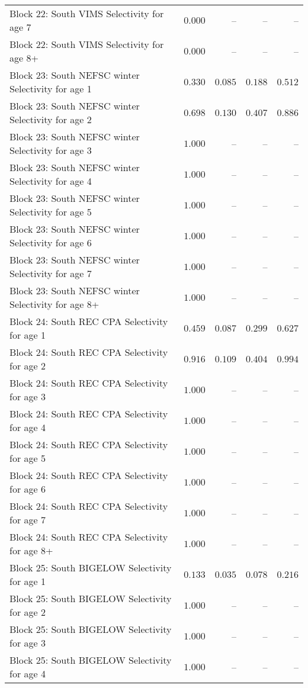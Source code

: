 \documentclass[
]{article}
\begin{document}
\begin{landscape}
\begin{longtable}[t]{lrrrr}
Block 22: South VIMS Selectivity for age 7 & $0.000$ & -- & -- & --\\
Block 22: South VIMS Selectivity for age 8+ & $0.000$ & -- & -- & --\\
Block 23: South NEFSC winter Selectivity for age 1 & $0.330$ & $0.085$ & $0.188$ & $0.512$\\
\addlinespace
Block 23: South NEFSC winter Selectivity for age 2 & $0.698$ & $0.130$ & $0.407$ & $0.886$\\
Block 23: South NEFSC winter Selectivity for age 3 & $1.000$ & -- & -- & --\\
Block 23: South NEFSC winter Selectivity for age 4 & $1.000$ & -- & -- & --\\
Block 23: South NEFSC winter Selectivity for age 5 & $1.000$ & -- & -- & --\\
Block 23: South NEFSC winter Selectivity for age 6 & $1.000$ & -- & -- & --\\
\addlinespace
Block 23: South NEFSC winter Selectivity for age 7 & $1.000$ & -- & -- & --\\
Block 23: South NEFSC winter Selectivity for age 8+ & $1.000$ & -- & -- & --\\
Block 24: South REC CPA Selectivity for age 1 & $0.459$ & $0.087$ & $0.299$ & $0.627$\\
Block 24: South REC CPA Selectivity for age 2 & $0.916$ & $0.109$ & $0.404$ & $0.994$\\
Block 24: South REC CPA Selectivity for age 3 & $1.000$ & -- & -- & --\\
\addlinespace
Block 24: South REC CPA Selectivity for age 4 & $1.000$ & -- & -- & --\\
Block 24: South REC CPA Selectivity for age 5 & $1.000$ & -- & -- & --\\
Block 24: South REC CPA Selectivity for age 6 & $1.000$ & -- & -- & --\\
Block 24: South REC CPA Selectivity for age 7 & $1.000$ & -- & -- & --\\
Block 24: South REC CPA Selectivity for age 8+ & $1.000$ & -- & -- & --\\
\addlinespace
Block 25: South BIGELOW Selectivity for age 1 & $0.133$ & $0.035$ & $0.078$ & $0.216$\\
Block 25: South BIGELOW Selectivity for age 2 & $1.000$ & -- & -- & --\\
Block 25: South BIGELOW Selectivity for age 3 & $1.000$ & -- & -- & --\\
Block 25: South BIGELOW Selectivity for age 4 & $1.000$ & -- & -- & --\\

\end{longtable}
\end{landscape}
\end{document}
